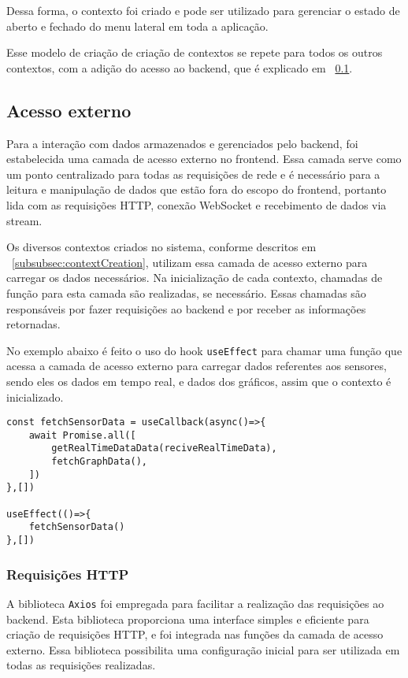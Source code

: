 Dessa forma, o contexto foi criado e pode ser utilizado para gerenciar o estado de aberto e fechado do menu lateral em toda a aplicação.

Esse modelo de criação de criação de contextos se repete para todos os outros contextos, com a adição do acesso ao backend, que é explicado em ~\ref{subsec:api_access}.

\subsection{Acesso externo}\label{subsec:api_access}
Para a interação com dados armazenados e gerenciados pelo backend, foi estabelecida uma camada de acesso externo no frontend. Essa camada serve como um ponto centralizado para todas as requisições de rede e é necessário para a leitura e manipulação de dados que estão fora do escopo do frontend, portanto lida com as requisições HTTP, conexão WebSocket e recebimento de dados via stream.

Os diversos contextos criados no sistema, conforme descritos em ~\ref{subsubsec:contextCreation}, utilizam essa camada de acesso externo para carregar os dados necessários. Na inicialização de cada contexto, chamadas de função para esta camada são realizadas, se necessário. Essas chamadas são responsáveis por fazer requisições ao backend e por receber as informações retornadas.

No exemplo abaixo é feito o uso do hook \texttt{useEffect} \cite{reactUseEffect} para chamar uma função que acessa a camada de acesso externo para carregar dados referentes aos sensores, sendo eles os dados em tempo real, e dados dos gráficos, assim que o contexto é inicializado.

\begin{verbatim}
const fetchSensorData = useCallback(async()=>{
    await Promise.all([
        getRealTimeDataData(reciveRealTimeData),
        fetchGraphData(),
    ])
},[])

useEffect(()=>{
    fetchSensorData()
},[])
\end{verbatim}


\subsubsection{Requisições HTTP}\label{subsubsec:httpRequest}
A biblioteca \texttt{Axios} \cite{axiosIntro} foi empregada para facilitar a realização das requisições ao backend. Esta biblioteca proporciona uma interface simples e eficiente para criação de requisições \gls{HTTP}, e foi integrada nas funções da camada de acesso externo. Essa biblioteca possibilita uma configuração inicial para ser utilizada em todas as requisições realizadas.

